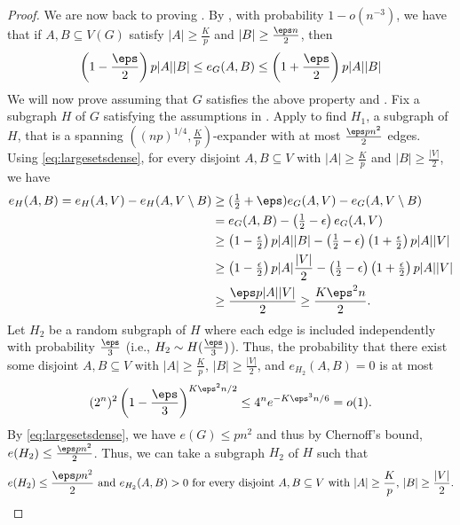 \documentclass[10pt,a4paper,reqno]{amsart}
\begin{document}
\begin{proof}
We are now back to proving .
By , with probability $1-o(n^{-3})$, we have that if $A,B\subseteq V(G)$ satisfy $|A|\ge \frac{K}{p}$ and $|B|\ge \frac{\eps n}{2}$, then 
\begin{equation}
\left(1-\frac{\eps}{2}\right)p|A||B|\le e_G(A,B)\le \left(1+\frac{\eps}{2}\right)p|A||B|
\label{eq:largesetsdense}
\end{equation}
We will now prove  assuming that $G$ satisfies the above property and . Fix a subgraph $H$ of $G$ satisfying the assumptions in . Apply  to find $H_1$, a subgraph of $H$, that is a spanning $\left((np)^{1/4}, \frac{K}{p}\right)$-expander with at most $\frac{\eps p n^2}{2}$ edges. Using \eqref{eq:largesetsdense}, for every disjoint $A,B\subseteq V$ with $|A|\ge \frac{K}{p}$ and $|B|\ge \frac{|V|}{2}$, we have
\begin{align*}
    e_H(A,B)
    = e_H(A,V) - e_H(A, V \setminus B) 
    &\ge (\tfrac{1}{2} + \eps)e_G(A,V) - e_G(A,V \setminus B) \\
    &= e_G(A,B) - \left(\tfrac{1}{2}-\epsilon\right)e_G(A,V) \\
    &\ge \left(1 - \tfrac{\epsilon}{2}\right)p|A||B| - \left(\tfrac{1}{2} - \epsilon\right) \left(1 + \tfrac{\epsilon}{2}\right)p|A||V| \\
    &\ge \left(1 - \tfrac{\epsilon}{2}\right)p|A|\frac{|V|}{2} - \left(\tfrac{1}{2} - \epsilon\right) \left(1 + \tfrac{\epsilon}{2}\right)p|A||V| \\
    &\ge \frac{\eps p|A||V|}{2}\ge \frac{K\eps^2 n}{2}.
\end{align*}
Let $H_2$ be a random subgraph of $H$ where each edge is included independently with probability $\frac{\eps}{3}$ (i.e., $H_2 \sim H(\frac{\eps}{3})$). Thus, the probability that there exist some disjoint $A,B\subseteq V$ with $|A|\ge \frac{K}{p}$, $|B|\ge \frac{|V|}{2}$, and $e_{H_2}(A,B)=0$ is at most 
\[
(2^n)^2 \left(1-\frac{\eps}{3}\right)^{K\eps^2 n/2} \le 4^n e^{-K\eps^3 n/6} = o(1).
\]
By \eqref{eq:largesetsdense}, we have $e(G)\le p n^2$ and thus by Chernoff's bound, \whp $e(H_2)\le \frac{\eps p n^2}{2}$. Thus, we can take a subgraph $H_2$ of $H$ such that 
\begin{equation}\label{eq:property of H2}
\text{$e(H_2)\le \frac{\eps p n^2}{2}$ and $e_{H_2}(A,B)>0$ for every disjoint $A,B\subseteq V$ with $|A|\ge \frac{K}{p}$, $|B|\ge \frac{|V|}{2}$.}
\end{equation}


\end{proof}
\end{document}
